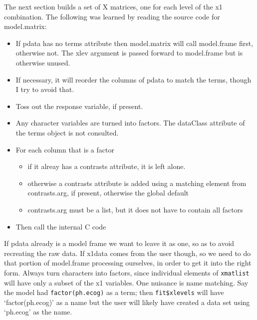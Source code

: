 \documentclass{article}
\newcommand{\code}[1]{\texttt{#1}}
\begin{document}
The next section builds a set of X matrices, one for each level of the
x1 combination. 
The following was learned by reading the source code for
model.matrix:
\begin{itemize}
\item If pdata has no terms attribute then model.matrix will call model.frame
  first, otherwise not.  The xlev argument is passed forward to model.frame
  but is otherwise unused.
\item If necessary, it will reorder the columns of pdata to match the terms,
  though I try to avoid that.  
\item Toss out the response variable, if present.
\item Any character variables are turned into factors.  The dataClass attribute
  of the terms object is not consulted.
\item For each column that is a factor
  \begin{itemize}
    \item if it alreay has a contrasts attribute, it is left alone.
    \item otherwise a contrasts attribute is added using a matching
      element from contrasts.arg, if present, otherwise the global default
    \item contrasts.arg must be a list, but it does not have to contain all
      factors
  \end{itemize}
  \item Then call the internal C code
\end{itemize}

If pdata already is a model frame we want to leave it as one, so as to
avoid recreating the raw data.
If x1data comes from the user though, so we need to do that portion of
model.frame processing ourselves, in order to get it into the right
form.  Always turn characters into factors, since individual elements
of \code{xmatlist} will have only a subset of the x1 variables.
One nuisance is name matching.  Say the model had 
\code{factor(ph.ecog)} as a term; then \code{fit\$xlevels} will have
`factor(ph.ecog)' as a name but the user will likely have created a
data set using `ph.ecog' as the name.
\end{document}
